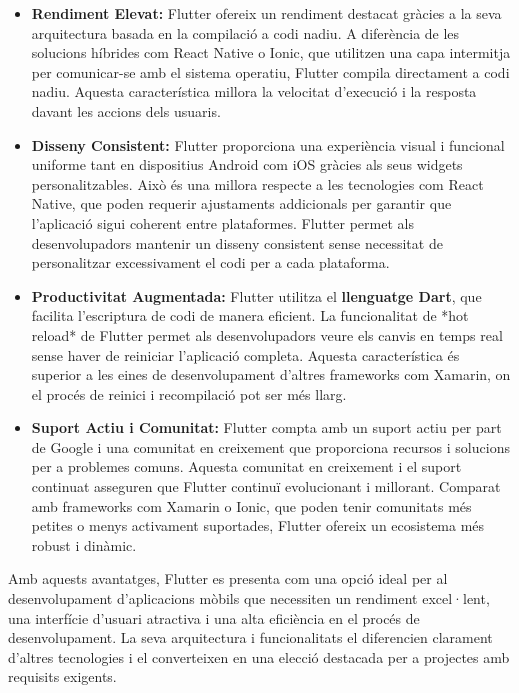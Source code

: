 \documentclass[a4paper,12pt,twoside]{ThesisStyle}
\begin{document}
\begin{itemize}
    \item \textbf{Rendiment Elevat:} Flutter ofereix un rendiment destacat gràcies a la seva arquitectura basada en la compilació a codi nadiu. A diferència de les solucions híbrides com React Native o Ionic, que utilitzen una capa intermitja per comunicar-se amb el sistema operatiu, Flutter compila directament a codi nadiu. Aquesta característica millora la velocitat d'execució i la resposta davant les accions dels usuaris.

    \item \textbf{Disseny Consistent:} Flutter proporciona una experiència visual i funcional uniforme tant en dispositius Android com iOS gràcies als seus widgets personalitzables. Això és una millora respecte a les tecnologies com React Native, que poden requerir ajustaments addicionals per garantir que l'aplicació sigui coherent entre plataformes. Flutter permet als desenvolupadors mantenir un disseny consistent sense necessitat de personalitzar excessivament el codi per a cada plataforma.

    \item \textbf{Productivitat Augmentada:} Flutter utilitza el \textbf{llenguatge Dart}, que facilita l'escriptura de codi de manera eficient. La funcionalitat de *hot reload* de Flutter permet als desenvolupadors veure els canvis en temps real sense haver de reiniciar l'aplicació completa. Aquesta característica és superior a les eines de desenvolupament d'altres frameworks com Xamarin, on el procés de reinici i recompilació pot ser més llarg.

    \item \textbf{Suport Actiu i Comunitat:} Flutter compta amb un suport actiu per part de Google i una comunitat en creixement que proporciona recursos i solucions per a problemes comuns. Aquesta comunitat en creixement i el suport continuat asseguren que Flutter continuï evolucionant i millorant. Comparat amb frameworks com Xamarin o Ionic, que poden tenir comunitats més petites o menys activament suportades, Flutter ofereix un ecosistema més robust i dinàmic.
\end{itemize}

Amb aquests avantatges, Flutter es presenta com una opció ideal per al desenvolupament d'aplicacions mòbils que necessiten un rendiment excel·lent, una interfície d'usuari atractiva i una alta eficiència en el procés de desenvolupament. La seva arquitectura i funcionalitats el diferencien clarament d'altres tecnologies i el converteixen en una elecció destacada per a projectes amb requisits exigents.
\end{document}
